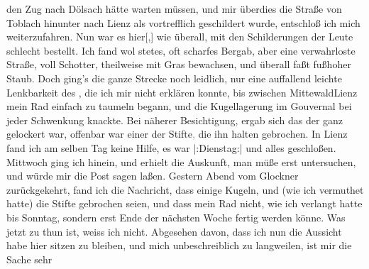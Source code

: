                den Zug nach Dölsach hätte warten müssen, und mir
               überdies die Straße von Toblach hinunter nach Lienz als vortrefflich geschildert wurde,
               entschloß ich mich weiterzufahren. Nun war es hier{[},{]}{ }{\pb}wie überall, mit den
               Schilderungen der Leute schlecht bestellt. Ich fand wol stetes, oft scharfes Bergab,
               aber eine verwahrloste Straße, voll Schotter, theilweise mit Gras bewachsen, und
               überall faßt fußhoher Staub. Doch ging’s die ganze Strecke noch leidlich, nur eine
               auffallend leichte Lenkbarkeit des \label{K_L03128-2v}\label{K_L03128-2}, die
               ich mir nicht erklären konnte, bis zwischen MittewaldLienz mein Rad einfach zu taumeln begann, und die
               Kugellagerung im Gouvernal bei jeder Schwenkung knackte. Bei näherer Besichtigung,
               ergab sich das der \label{K_L03128-3v}\label{K_L03128-3} ganz gelockert
               war, offenbar war einer der Stifte\textcolor{gray}{,} die ihn halten gebrochen. In Lienz fand ich am selben Tag
               keine Hilfe, es war |:Dienstag:| \label{K_L03128-4v}\label{K_L03128-4} und alles geschloßen. Mittwoch ging ich hinein, und erhielt die Auskunft, man
               müße erst untersuchen, und würde mir die Post sagen laßen. Gestern{ }Abend vom Glockner zurückgekehrt,
               fand ich die Nachricht, dass einige Kugeln, und (wie ich vermuthet hatte) die Stifte
               gebrochen seien, und dass mein Rad nicht, wie ich {\pb}verlangt hatte bis Sonntag, sondern erst Ende der nächsten Woche fertig
               werden könne. Was jetzt zu thun ist, weiss ich nicht. Abgesehen davon, dass ich nun
               die Aussicht habe hier sitzen zu bleiben, und mich unbeschreiblich zu langweilen, ist
               mir die Sache \label{K_L03128-5v}\label{K_L03128-5} sehr
